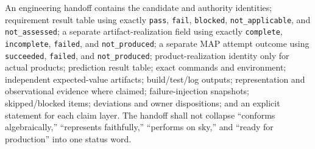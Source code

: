 \documentclass[10pt]{article}
\begin{document}
An engineering handoff contains the candidate and authority identities;
requirement result table using exactly \texttt{pass}, \texttt{fail},
\texttt{blocked}, \texttt{not\_applicable}, and \texttt{not\_assessed}; a
separate artifact-realization field using exactly \texttt{complete},
\texttt{incomplete}, \texttt{failed}, and \texttt{not\_produced}; a separate
MAP attempt outcome using \texttt{succeeded}, \texttt{failed}, and
\texttt{not\_produced}; product-realization
identity only for actual products; prediction result table; exact commands and
environment; independent expected-value artifacts; build/test/log outputs;
representation and observational evidence where claimed; failure-injection
snapshots; skipped/blocked items; deviations and owner dispositions; and an
explicit statement for each claim layer. The handoff shall not collapse
``conforms algebraically,'' ``represents faithfully,'' ``performs on sky,'' and
``ready for production'' into one status word.
\end{document}
